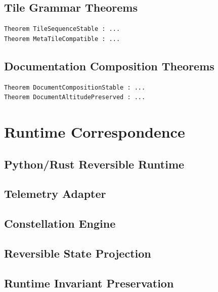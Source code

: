 \documentclass[11pt]{article}
\begin{document}
\subsection{Tile Grammar Theorems}
\begin{verbatim}
Theorem TileSequenceStable : ...
Theorem MetaTileCompatible : ...
\end{verbatim}

\subsection{Documentation Composition Theorems}
\begin{verbatim}
Theorem DocumentCompositionStable : ...
Theorem DocumentAltitudePreserved : ...
\end{verbatim}

\newpage



\section{Runtime Correspondence}

\subsection{Python/Rust Reversible Runtime}
\subsection{Telemetry Adapter}
\subsection{Constellation Engine}
\subsection{Reversible State Projection}
\subsection{Runtime Invariant Preservation}

\newpage

\end{document}
